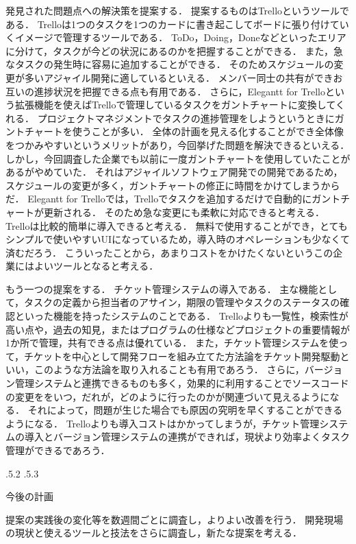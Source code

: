 \documentclass[uplatex]{jsarticle}
\makeatletter
\renewcommand{\section}{%
    \if@slide\clearpage\fi
    \@startsection{section}{1}{\z@}%
    {\Cvs \@plus.5\Cdp \@minus.2\Cdp}%
    {.5\Cvs \@plus.3\Cdp}%
    {\normalfont\raggedright}}
\makeatother
\begin{document}
発見された問題点への解決策を提案する．
提案するものはTrelloというツールである．
Trelloは1つのタスクを1つのカードに書き起こしてボードに張り付けていくイメージで管理するツールである．
ToDo，Doing，Doneなどといったエリアに分けて，タスクが今どの状況にあるのかを把握することができる．
また，急なタスクの発生時に容易に追加することができる．
そのためスケジュールの変更が多いアジャイル開発に適しているといえる．
メンバー同士の共有ができお互いの進捗状況を把握できる点も有用である．
さらに，Elegantt for Trelloという拡張機能を使えばTrelloで管理しているタスクをガントチャートに変換してくれる．
プロジェクトマネジメントでタスクの進捗管理をしようというときにガントチャートを使うことが多い．
全体の計画を見える化することができ全体像をつかみやすいというメリットがあり，今回挙げた問題を解決できるといえる．
しかし，今回調査した企業でも以前に一度ガントチャートを使用していたことがあるがやめていた．
それはアジャイルソフトウェア開発での開発であるため，スケジュールの変更が多く，ガントチャートの修正に時間をかけてしまうからだ．
Elegantt for Trelloでは，Trelloでタスクを追加するだけで自動的にガントチャートが更新される．
そのため急な変更にも柔軟に対応できると考える．
Trelloは比較的簡単に導入できると考える．
無料で使用することができ，とてもシンプルで使いやすいUIになっているため，導入時のオペレーションも少なくて済むだろう．
こういったことから，あまりコストをかけたくないというこの企業にはよいツールとなると考える．

もう一つの提案をする．
チケット管理システムの導入である．
主な機能として，タスクの定義から担当者のアサイン，期限の管理やタスクのステータスの確認といった機能を持ったシステムのことである．
Trelloよりも一覧性，検索性が高い点や，過去の知見，またはプログラムの仕様などプロジェクトの重要情報が1か所で管理，共有できる点は優れている．
また，チケット管理システムを使って，チケットを中心として開発フローを組み立てた方法論をチケット開発駆動といい，このような方法論を取り入れることも有用であろう．\cite{ikeda2014}
さらに，バージョン管理システムと連携できるものも多く，効果的に利用することでソースコードの変更ををいつ，だれが，どのように行ったのかが関連づいて見えるようになる．
それによって，問題が生じた場合でも原因の究明を早くすることができるようになる．
Trelloよりも導入コストはかかってしまうが，チケット管理システムの導入とバージョン管理システムの連携ができれば，現状より効率よくタスク管理ができるであろう．

\section{今後の計画}

提案の実践後の変化等を数週間ごとに調査し，よりよい改善を行う．
開発現場の現状と使えるツールと技法をさらに調査し，新たな提案を考える．




\end{document}
